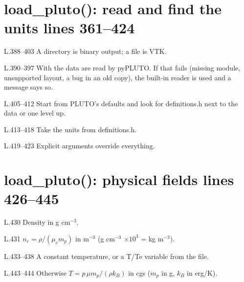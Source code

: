 \section*{\normalsize load\_pluto(): read and find the units \hfill{\small\mdseries\color{gray}lines 361--424}}

\begin{lines}
\item[L.388–403] A directory is binary output; a file is VTK.
\item[L.390–397] With  the data are read by pyPLUTO. If that fails (missing module, unsupported layout, a bug in an old copy), the built-in reader is used and a message says so.
\item[L.405–412] Start from PLUTO's defaults and look for definitions.h next to the data or one level up.
\item[L.413–418] Take the units from definitions.h.
\item[L.419–423] Explicit arguments override everything.
\end{lines}
\section*{\normalsize load\_pluto(): physical fields \hfill{\small\mdseries\color{gray}lines 426--445}}

\begin{lines}
\item[L.430] Density in g cm$^{-3}$.
\item[L.431] $n_e=\rho/(\mu_e m_p)$ in m$^{-3}$ (g cm$^{-3}$ $\times10^3$ = kg m$^{-3}$).
\item[L.433–438] A constant temperature, or a T/Te variable from the file.
\item[L.443–444] Otherwise $T=p\,\mu m_p/(\rho k_B)$ in cgs ($m_p$ in g, $k_B$ in erg/K).
\end{lines}
